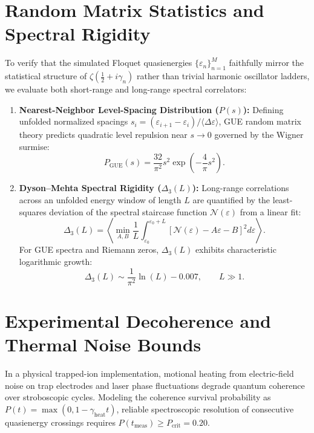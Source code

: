 \documentclass[11pt,a4paper]{article}
\begin{document}
\section{Random Matrix Statistics and Spectral Rigidity}
To verify that the simulated Floquet quasienergies $\{\varepsilon_n\}_{n=1}^M$ faithfully mirror the statistical structure of $\zeta(\frac{1}{2} + i\gamma_n)$ rather than trivial harmonic oscillator ladders, we evaluate both short-range and long-range spectral correlators:

\begin{enumerate}
    \item \textbf{Nearest-Neighbor Level-Spacing Distribution ($P(s)$):} Defining unfolded normalized spacings $s_i = (\varepsilon_{i+1} - \varepsilon_i)/\langle \Delta\varepsilon \rangle$, GUE random matrix theory predicts quadratic level repulsion near $s \to 0$ governed by the Wigner surmise:
    \begin{equation}
    P_{\mathrm{GUE}}(s) = \frac{32}{\pi^2} s^2 \exp\left(-\frac{4}{\pi} s^2\right).
    \end{equation}
    \item \textbf{Dyson--Mehta Spectral Rigidity ($\Delta_3(L)$):} Long-range correlations across an unfolded energy window of length $L$ are quantified by the least-squares deviation of the spectral staircase function $\mathcal{N}(\varepsilon)$ from a linear fit:
    \begin{equation}
    \Delta_3(L) = \left\langle \min_{A, B} \frac{1}{L} \int_{\varepsilon_0}^{\varepsilon_0 + L} \left[\mathcal{N}(\varepsilon) - A\varepsilon - B\right]^2 d\varepsilon \right\rangle.
    \end{equation}
    For GUE spectra and Riemann zeros, $\Delta_3(L)$ exhibits characteristic logarithmic growth:
    \begin{equation}
    \Delta_3(L) \sim \frac{1}{\pi^2} \ln(L) - 0.007, \qquad L \gg 1.
    \end{equation}
\end{enumerate}

\section{Experimental Decoherence and Thermal Noise Bounds}
In a physical trapped-ion implementation, motional heating from electric-field noise on trap electrodes and laser phase fluctuations degrade quantum coherence over stroboscopic cycles. Modeling the coherence survival probability as $P(t) = \max(0, 1 - \gamma_{\mathrm{heat}} t)$, reliable spectroscopic resolution of consecutive quasienergy crossings requires $P(t_{\mathrm{meas}}) \ge P_{\mathrm{crit}} = 0.20$.
\end{document}
